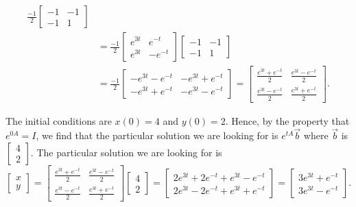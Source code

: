 \begin{example}
\begin{equation*}
\begin{split}
\frac{-1}{2}
\begin{bmatrix}
-1 & -1 \\
-1 & 1
\end{bmatrix}
\\
& =
\frac{-1}{2}
\begin{bmatrix}
e^{3t} & e^{-t} \\
e^{3t} & -e^{-t}
\end{bmatrix}
\begin{bmatrix}
-1 & -1 \\
-1 & 1
\end{bmatrix}
\\
& =
\frac{-1}{2}
\begin{bmatrix}
-e^{3t}-e^{-t} & -e^{3t}+e^{-t} \\
-e^{3t}+e^{-t} & -e^{3t}-e^{-t}
\end{bmatrix}
 =
\begin{bmatrix}
\frac{e^{3t}+e^{-t}}{2} & \frac{e^{3t}-e^{-t}}{2} \\
\frac{e^{3t}-e^{-t}}{2} & \frac{e^{3t}+e^{-t}}{2}
\end{bmatrix} .
\end{split}
\end{equation*}

The initial conditions are $x(0) = 4$ and $y(0) = 2$.  Hence, by the property
that $e^{0A} = I$, we find that the particular solution we are looking for
is $e^{tA} \vec{b}$ where $\vec{b}$ is $\left[
\begin{smallmatrix} 4 \\ 2 \end{smallmatrix} \right]$.
The particular solution we are looking for is
\begin{equation*}
\begin{bmatrix}
x \\ y
\end{bmatrix}
=
\begin{bmatrix}
\frac{e^{3t}+e^{-t}}{2} & \frac{e^{3t}-e^{-t}}{2} \\
\frac{e^{3t}-e^{-t}}{2} & \frac{e^{3t}+e^{-t}}{2}
\end{bmatrix}
\begin{bmatrix}
4 \\ 2
\end{bmatrix}
=
\begin{bmatrix}
2e^{3t}+2e^{-t} + e^{3t}-e^{-t} \\
2e^{3t}-2e^{-t} + e^{3t}+e^{-t}
\end{bmatrix}
=
\begin{bmatrix}
3e^{3t}+e^{-t} \\
3e^{3t}-e^{-t}
\end{bmatrix} .
\end{equation*}
\end{example}


